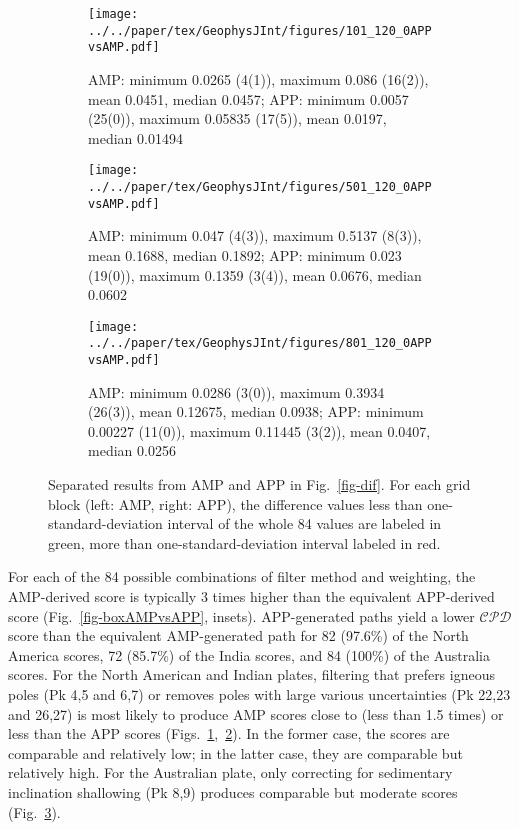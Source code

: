 \begin{figure}
	\centering
	\begin{subfigure}{1.01\textwidth}
		\texttt{[image: ../../paper/tex/GeophysJInt/figures/101\_120\_0APPvsAMP.pdf]}
		\caption{AMP\@: minimum 0.0265 (4(1)), maximum 0.086 (16(2)), mean
		0.0451, median 0.0457; APP\@: minimum 0.0057 (25(0)), maximum
		0.05835 (17(5)), mean 0.0197, median 0.01494}\label{fig-na-difAMPvsAPP}
	\end{subfigure}
	\vspace{.1em}
	\begin{subfigure}{1.01\textwidth}
		\texttt{[image: ../../paper/tex/GeophysJInt/figures/501\_120\_0APPvsAMP.pdf]}
		\caption{AMP\@: minimum 0.047 (4(3)), maximum 0.5137 (8(3)), mean
		0.1688, median 0.1892; APP\@: minimum 0.023 (19(0)), maximum 0.1359
		(3(4)), mean 0.0676, median 0.0602}\label{fig-in-difAMPvsAPP}
	\end{subfigure}
	\vspace{.1em}
	\begin{subfigure}{1.01\textwidth}
		\texttt{[image: ../../paper/tex/GeophysJInt/figures/801\_120\_0APPvsAMP.pdf]}
		\caption{AMP\@: minimum 0.0286 (3(0)), maximum 0.3934 (26(3)), mean
		0.12675, median 0.0938; APP\@: minimum 0.00227 (11(0)), maximum 0.11445
		(3(2)), mean 0.0407, median 0.0256}\label{fig-au-difAMPvsAPP}
	\end{subfigure}
	\caption[$\mathcal{CPD}$ of each plate's paleomagnetic APWPs vs its FHM
predicted APWP (AMP vs APP)]{Separated results from AMP and APP in
Fig.~\ref{fig-dif}. For each grid block (left: AMP, right: APP), the difference
values less than one-standard-deviation interval of the whole 84 values are
labeled in green, more than one-standard-deviation interval labeled in
red.}\label{fig-difAMPvsAPP}
\end{figure}

For each of the 84 possible combinations of filter method and weighting, the
AMP-derived score is typically 3 times higher than the equivalent
APP-derived score (Fig.~\ref{fig-boxAMPvsAPP}, insets). APP-generated paths
yield a lower $\mathcal{CPD}$ score than the equivalent AMP-generated path for
82 (97.6\%) of the North America scores, 72 (85.7\%) of the India scores, and 84
(100\%) of the Australia scores. For the North American and Indian plates,
filtering that prefers igneous poles (Pk 4,5 and 6,7) or removes
poles with large various uncertainties (Pk 22,23 and 26,27) is most likely
to produce AMP scores close to (less than 1.5 times) or less than the APP scores
(Figs.~\ref{fig-na-difAMPvsAPP},~\ref{fig-in-difAMPvsAPP}). In the former case,
the scores are comparable and relatively low; in the latter case, they are
comparable but relatively high. For the Australian plate, only correcting for
sedimentary inclination shallowing (Pk 8,9) produces comparable but moderate
scores (Fig.~\ref{fig-au-difAMPvsAPP}).

